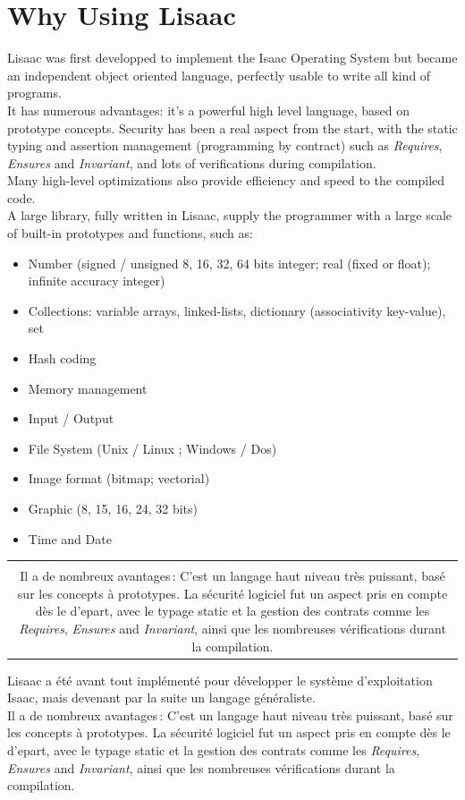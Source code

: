 \documentclass[11pt]{mybook}
\newcommand{\isaac}{I{\sc{}saac} }
\newcommand{\fr}[1]{
  \if \frenchversion 1
    \if \englishversion 1    
    \vspace{2mm}
    \noindent\begin{tabular}{|c}
      {
        \begin{minipage}{15.5cm}
          \textit{#1}
        \end{minipage}
      }
    \end{tabular}
    \else
    #1
    \fi
  \fi
}
\newcommand{\en}[1]
{
  \if \englishversion 1
  #1
  \fi
}
\begin{document}
\section{Why Using Lisaac}
\label{introduction:use_of_lisaac}
%
\en{Lisaac was first developped to implement the \isaac Operating System but
became an independent object oriented language, perfectly usable to
write all kind of programs.\\

It has numerous advantages: it's a powerful high level
language, based on prototype concepts. Security has been a real aspect 
from the start, with the static typing and
assertion management (programming by contract) such as
{\it{}Requires}, {\it{}Ensures} and {\it{}Invariant}, and lots of
verifications during compilation.\\

Many high-level optimizations also provide efficiency and speed to the compiled code.\\

A large library, fully written in Lisaac, supply the programmer with
a large scale of built-in prototypes and functions, such as:
\begin{itemize}
	\item{Number (signed / unsigned 8, 16, 32, 64 bits integer; real (fixed or float); infinite accuracy integer)}
	\item{Collections: variable arrays, linked-lists, dictionary (associativity key-value), set}
	\item{Hash coding}
	\item{Memory management}
	\item{Input / Output}
	\item{File System (Unix / Linux ; Windows / Dos)}
	\item{Image format (bitmap; vectorial)}
	\item{Graphic (8, 15, 16, 24, 32 bits)}
	\item{Time and Date}
\end{itemize} 
}

\fr{
	Lisaac a \'et\'e avant tout impl\'ement\'e pour d\'evelopper le syst\`eme d'exploitation Isaac, mais devenant par la suite un langage g\'en\'eraliste.
\\
	Il a de nombreux avantages\,: C'est un langage haut niveau tr\`es puissant, bas\'e sur les concepts à prototypes.
	La s\'ecurit\'e logiciel fut un aspect pris en compte d\`es le d'epart, avec le typage static et la gestion des contrats comme les
{\it{}Requires}, {\it{}Ensures} and {\it{}Invariant}, ainsi que les nombreuses v\'erifications durant la compilation.
}
\end{document}
